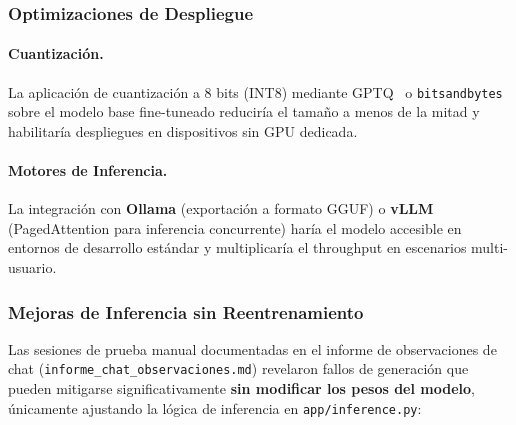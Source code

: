 \subsubsection{Optimizaciones de Despliegue}

\paragraph{Cuantización.} La aplicación de cuantización a 8 bits (INT8) mediante GPTQ~\cite{frantar2022gptq} o \texttt{bitsandbytes} sobre el modelo base fine-tuneado reduciría el tamaño a menos de la mitad y habilitaría despliegues en dispositivos sin GPU dedicada.

\paragraph{Motores de Inferencia.} La integración con \textbf{Ollama} (exportación a formato GGUF) o \textbf{vLLM}~\cite{kwon2023efficient} (PagedAttention para inferencia concurrente) haría el modelo accesible en entornos de desarrollo estándar y multiplicaría el throughput en escenarios multi-usuario.

\subsubsection{Mejoras de Inferencia sin Reentrenamiento}

Las sesiones de prueba manual documentadas en el informe de observaciones de chat (\texttt{informe\_chat\_obs\-er\-va\-ciones.md}) revelaron fallos de generación que pueden mitigarse significativamente \textbf{sin modificar los pesos del modelo}, únicamente ajustando la lógica de inferencia en \texttt{app/inference.py}:


